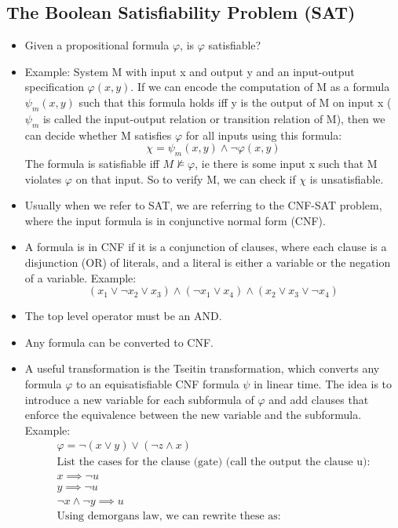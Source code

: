 \documentclass{article}
\begin{document}
\subsection{The Boolean Satisfiability Problem (SAT)}
\begin{itemize}
\item Given a propositional formula $\varphi$, is $\varphi$ satisfiable?
\item Example: System M with input x and output y and an input-output specification $\varphi(x, y)$. If we can encode the computation of M as a formula $\psi_m(x,y)$ such that this formula holds iff y is the output of M on input x ($\psi_m$ is called the input-output relation or transition relation of M), then we can decide whether M satisfies $\varphi$ for all inputs using this formula: \[\chi = \psi_m(x, y) \land \neg \varphi(x, y)\] The formula is satisfiable iff $M\not\models \varphi$, ie there is some input x such that M violates $\varphi$ on that input. So to verify M, we can check if $\chi$ is unsatisfiable.
\item Usually when we refer to SAT, we are referring to the CNF-SAT problem, where the input formula is in conjunctive normal form (CNF).
\item A formula is in CNF if it is a conjunction of clauses, where each clause is a disjunction (OR) of literals, and a literal is either a variable or the negation of a variable. Example: \[(x_1 \lor \neg x_2 \lor x_3) \land (\neg x_1 \lor x_4) \land (x_2 \lor x_3 \lor \neg x_4)
\]
\item The top level operator must be an AND.
\item Any formula can be converted to CNF.
\item A useful transformation is the Tseitin transformation, which converts any formula $\varphi$ to an equisatisfiable CNF formula $\psi$ in linear time. The idea is to introduce a new variable for each subformula of $\varphi$ and add clauses that enforce the equivalence between the new variable and the subformula. Example: \begin{align*}
\varphi = \neg(x\lor y)\lor(\neg z\land x) \\
\text{List the cases for the clause (gate) (call the output the clause u):} \\
x\implies \neg u \\
y\implies \neg u \\
\neg x \land \neg y \implies u \\
\text{Using demorgans law, we can rewrite these as:} \\

\end{align*}
\end{itemize}
\end{document}
